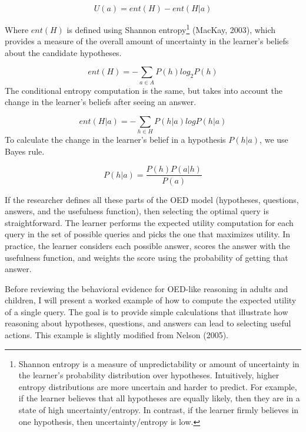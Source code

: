 \documentclass[oneside]{report}
\begin{document}
\[U(a) = ent(H) - ent(H|a)\]

\noindent
Where \(ent(H)\) is defined using Shannon entropy\footnote{Shannon
  entropy is a measure of unpredictability or amount of uncertainty in
  the learner's probability distribution over hypotheses. Intuitively,
  higher entropy distributions are more uncertain and harder to predict.
  For example, if the learner believes that all hypotheses are equally
  likely, then they are in a state of high uncertainty/entropy. In
  contrast, if the learner firmly believes in one hypothesis, then
  uncertainty/entropy is low.} (MacKay, 2003), which provides a measure
of the overall amount of uncertainty in the learner's beliefs about the
candidate hypotheses.

\[ent(H) = -\sum_{a\in A}{P(h)log_2P(h)}\] \noindent
The conditional entropy computation is the same, but takes into account
the change in the learner's beliefs after seeing an answer.

\[ ent(H|a) = -\sum_{h\in H}{P(h|a)logP(h|a)} \] \noindent
To calculate the change in the learner's belief in a hypothesis
\(P(h|a)\), we use Bayes rule.

\[ P(h|a) = \frac{P(h)P(a|h)}{P(a)} \]

\noindent
If the researcher defines all these parts of the OED model (hypotheses,
questions, answers, and the usefulness function), then selecting the
optimal query is straightforward. The learner performs the expected
utility computation for each query in the set of possible queries and
picks the one that maximizes utility. In practice, the learner considers
each possible answer, scores the answer with the usefulness function,
and weights the score using the probability of getting that answer.

Before reviewing the behavioral evidence for OED-like reasoning in
adults and children, I will present a worked example of how to compute
the expected utility of a single query. The goal is to provide simple
calculations that illustrate how reasoning about hypotheses, questions,
and answers can lead to selecting useful actions. This example is
slightly modified from Nelson (2005).
\end{document}
